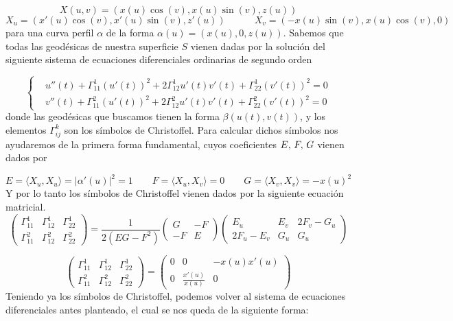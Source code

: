 \documentclass[fleqn]{article}
\begin{document}
    $$X(u,v) = (x(u)\cos(v), x(u) \sin(v), z(u))$$
    $$X_u = (x'(u)\cos(v), x'(u)\sin(v), z'(u)) \quad \quad \quad X_v = (-x(u)\sin(v), x(u)\cos(v), 0 )$$
    para una curva perfil $\alpha$ de la forma $\alpha(u) = (x(u), 0, z(u))$. Sabemos que todas las geodésicas de nuestra superficie $S$ vienen dadas por 
    la solución del siguiente sistema de ecuaciones diferenciales ordinarias de segundo orden

    $$\left\{
    \begin{aligned}
        & u''(t) + \Gamma_{11}^1 (u'(t))^2 + 2\Gamma_{12}^1 u'(t) v'(t) + \Gamma_{22}^1 (v'(t))^2 = 0\\
        & v''(t) + \Gamma_{11}^2 (u'(t))^2 + 2\Gamma_{12}^2 u'(t) v'(t) + \Gamma_{22}^2 (v'(t))^2 = 0
    \end{aligned}
    \right.$$
    donde las geodésicas que buscamos tienen la forma $\beta(u(t), v(t))$, y los elementos $\Gamma_{ij}^k$ son los símbolos de Christoffel. Para calcular dichos
    símbolos nos ayudaremos de la primera forma fundamental, cuyos coeficientes $E, \thinspace F, \thinspace G$ vienen dados por 

    $$E = \langle X_u,X_u \rangle = |\alpha'(u)|^2 = 1 \quad \quad 
    F = \langle X_u,X_v \rangle = 0 \quad \quad 
    G = \langle X_v,X_v \rangle = -x(u)^2 $$
    Y por lo tanto los símbolos de Christoffel vienen dados por la siguiente ecuación matricial.
    $$
    \begin{pmatrix}
        \Gamma_{11}^1 & \Gamma_{12}^1 & \Gamma_{22}^1\\
        \Gamma_{11}^2 & \Gamma_{12}^2 & \Gamma_{22}^2
    \end{pmatrix}
    = \frac{1}{2(EG-F^2)}
    \begin{pmatrix}
        G & -F \\
        -F & E
    \end{pmatrix}
    \begin{pmatrix}
        E_u & E_v & 2F_v - G_u \\
        2F_u - E_v & G_u & G_u
    \end{pmatrix}
    $$

    $$
    \begin{pmatrix}
        \Gamma_{11}^1 & \Gamma_{12}^1 & \Gamma_{22}^1\\
        \Gamma_{11}^2 & \Gamma_{12}^2 & \Gamma_{22}^2
    \end{pmatrix} = 
    \begin{pmatrix}
        0 & 0 & - x(u)x'(u) \\
        0 & \frac{x'(u)}{x(u)} & 0
    \end{pmatrix}
    $$
    Teniendo ya los símbolos de Christoffel, podemos volver al sistema de ecuaciones diferenciales antes planteado, el cual se nos queda de la siguiente forma:
    
\end{document}
